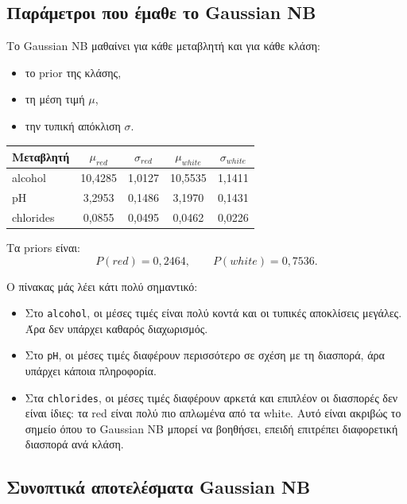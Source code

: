 \documentclass[11pt,a4paper]{article}
\newcommand{\code}[1]{\texttt{#1}}
\begin{document}
\subsection{Παράμετροι που έμαθε το Gaussian NB}

Το Gaussian NB μαθαίνει για κάθε μεταβλητή και για κάθε κλάση:
\begin{itemize}
    \item το prior της κλάσης,
    \item τη μέση τιμή \(\mu\),
    \item την τυπική απόκλιση \(\sigma\).
\end{itemize}

\begin{center}
\begin{tabular}{lcccc}
\toprule
Μεταβλητή & \(\mu_{red}\) & \(\sigma_{red}\) & \(\mu_{white}\) & \(\sigma_{white}\) \\
\midrule
alcohol & 10,4285 & 1,0127 & 10,5535 & 1,1411 \\
pH & 3,2953 & 0,1486 & 3,1970 & 0,1431 \\
chlorides & 0,0855 & 0,0495 & 0,0462 & 0,0226 \\
\bottomrule
\end{tabular}
\end{center}

Τα priors είναι:
\[
P(red)=0{,}2464,
\qquad
P(white)=0{,}7536.
\]

Ο πίνακας μάς λέει κάτι πολύ σημαντικό:
\begin{itemize}
    \item Στο \code{alcohol}, οι μέσες τιμές είναι πολύ κοντά και οι τυπικές
    αποκλίσεις μεγάλες. Άρα δεν υπάρχει καθαρός διαχωρισμός.

    \item Στο \code{pH}, οι μέσες τιμές διαφέρουν περισσότερο σε σχέση με τη
    διασπορά, άρα υπάρχει κάποια πληροφορία.

    \item Στα \code{chlorides}, οι μέσες τιμές διαφέρουν αρκετά και επιπλέον
    οι διασπορές δεν είναι ίδιες: τα red είναι πολύ πιο απλωμένα από τα white.
    Αυτό είναι ακριβώς το σημείο όπου το Gaussian NB μπορεί να βοηθήσει,
    επειδή επιτρέπει διαφορετική διασπορά ανά κλάση.
\end{itemize}

\subsection{Συνοπτικά αποτελέσματα Gaussian NB}
\end{document}
